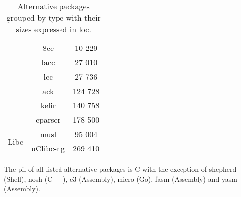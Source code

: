 \begin{table}[!ht]
\begin{tabular}{|c|c|c|}
        \cline{2-3}
        & 8cc \cite{8cc} & 10 229 \\
        \cline{2-3}
        & lacc \cite{lacc} & 27 010 \\
        \cline{2-3}
        & lcc \cite{lcc} \footnotemark[4] & 27 736 \\
        \cline{2-3}
        & ack \cite{ack} & 124 728 \\
        \cline{2-3}
        & kefir \cite{kefir} & 140 758 \\
        \cline{2-3}
        & cparser \cite{cparser} & 178 500 \\
        \hline
        \hline
        \multirow{2}{*}{Libc}
        & musl \cite{musl} & 95 004 \\
        \cline{2-3}
        & uClibc-ng \cite{uclibc-ng} & 269 410 \\
        \hline
    \end{tabular}
    \caption{Alternative packages grouped by type with their sizes expressed in \gls{loc}.}
\end{table}


The \gls{pil} of all listed alternative packages is C with the exception of shepherd (Shell), nosh (C++), e3 (Assembly), micro (Go), fasm (Assembly) and yasm (Assembly).

